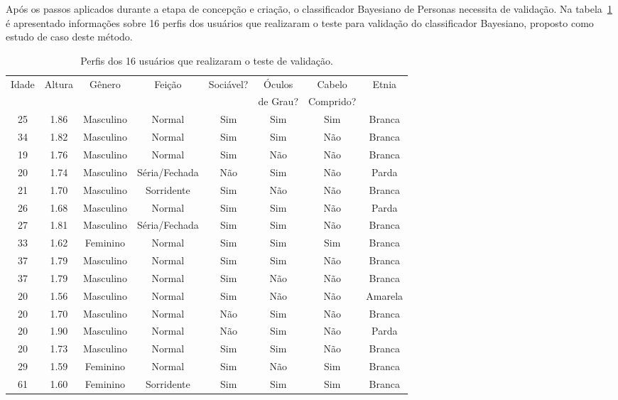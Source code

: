 Após os passos aplicados durante a etapa de concepção e criação, o classificador Bayesiano de Personas necessita de validação. Na tabela~\ref{tab:perfilvalidacao} é apresentado informações sobre 16 perfis dos usuários que realizaram o teste para validação do classificador Bayesiano, proposto como estudo de caso deste método.

\begin{table}[!ht]
	\caption{Perfis dos 16 usuários que realizaram o teste de validação.}
	\label{tab:perfilvalidacao}
	\centering
	\begin{tabular}{c | c | c | c | c | c | c | c}
        \hline
        Idade & Altura & Gênero & Feição & Sociável? & Óculos & Cabelo & Etnia \\
         &  &  &  &  & de Grau? & Comprido? &  \\ \hline
		 25 & 1.86 & Masculino & Normal & Sim & Sim & Sim & Branca \\ \hline
		 34 & 1.82 & Masculino & Normal & Sim & Sim & Não & Branca \\ \hline
		 19 & 1.76 & Masculino & Normal & Sim & Não & Não & Branca \\ \hline
		 20 & 1.74 & Masculino & Séria/Fechada & Não & Sim & Não & Parda \\ \hline
		 21 & 1.70 & Masculino & Sorridente & Sim & Não & Não & Branca \\ \hline
		 26 & 1.68 & Masculino & Normal & Sim & Sim & Não & Parda \\ \hline
		 27 & 1.81 & Masculino & Séria/Fechada & Sim & Sim & Não & Branca \\ \hline
		 33 & 1.62 & Feminino & Normal & Sim & Sim & Sim & Branca \\ \hline
		 37 & 1.79 & Masculino & Normal & Sim & Sim & Não & Branca \\ \hline
		 37 & 1.79 & Masculino & Normal & Sim & Não & Não & Branca \\ \hline
		 20 & 1.56 & Masculino & Normal & Sim & Não & Não & Amarela \\ \hline
		 20 & 1.70 & Masculino & Normal & Não & Sim & Não & Branca \\ \hline
		 20 & 1.90 & Masculino & Normal & Não & Sim & Não & Parda \\ \hline
		 20 & 1.73 & Masculino & Normal & Sim & Sim & Não & Branca \\ \hline
		 29 & 1.59 & Feminino & Normal & Sim & Não & Sim & Branca \\ \hline
		 61 & 1.60 & Feminino & Sorridente & Sim & Sim & Sim & Branca \\ \hline
	\end{tabular}
\end{table}

